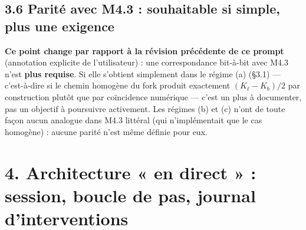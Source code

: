 \documentclass[11pt,a4paper]{article}
\begin{document}
\subsection*{3.6 Parité avec M4.3 : souhaitable si simple, plus une exigence}

\textbf{Ce point change par rapport à la révision précédente de ce
prompt} (annotation explicite de l'utilisateur) : une correspondance
bit-à-bit avec M4.3 n'est \textbf{plus requise}. Si elle s'obtient
simplement dans le régime (a) (\S3.1) --- c'est-à-dire si le chemin
homogène du fork produit exactement $(K_\ell-K_b)/2$ par construction
plutôt que par coïncidence numérique --- c'est un plus à documenter, pas
un objectif à poursuivre activement. Les régimes (b) et (c) n'ont de
toute façon aucun analogue dans M4.3 littéral (qui n'implémentait que le
cas homogène) : aucune parité n'est même définie pour eux.

\section*{4. Architecture « en direct » : session, boucle de pas, journal d'interventions}
\end{document}
